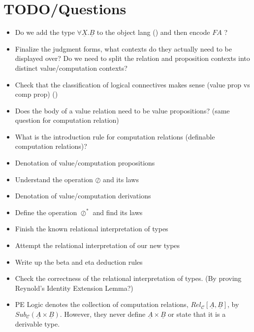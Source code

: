 \documentclass{article}
\begin{document}
\section{TODO/Questions}
\begin{itemize}
    \item Do we add the type $\forall \underline{X}. \underline{B}$ to the object lang () and then encode $F A$ ?
    \item Finalize the judgment forms, what contexts do they actually need to be displayed over? Do we need to split the relation and proposition contexts into distinct value/computation contexts?
    \item Check that the classification of logical connectives makes sense (value prop vs comp prop) ()
    \item {}Does the body of a value relation need to be value propositions? (same question for computation relation)
    \item What is the introduction rule for computation relations (definable computation relations)?
    \item Denotation of value/computation propositions
    \item Understand the operation $\oslash$ and its laws
    \item Denotation of value/computation derivations 
    \item Define the operation $\oslash^*$ and find its laws
    \item Finish the known relational interpretation of types
    \item Attempt the relational interpretation of our new types 
    \item Write up the beta and eta deduction rules 
    \item Check the correctness of the relational interpretation of types. (By proving Reynold's Identity Extension Lemma?)
    \item PE Logic denotes the collection of computation relations, $Rel_{\mathcal{C}}[\underline{A},\underline{B}]$, by $Sub_{\mathcal{C}}(\underline{A} \times \underline{B})$. However,
          they never define $\underline{A} \times \underline{B}$ or state that it is a derivable type. 
\end{itemize}
\end{document}
